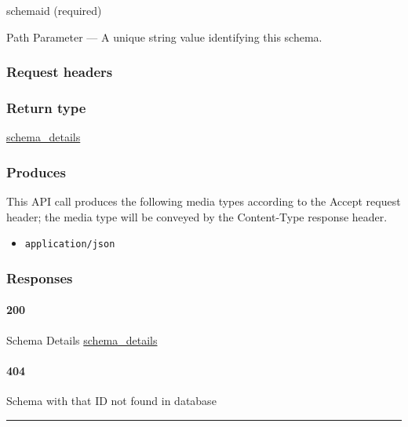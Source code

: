 schemaid (required)

{Path Parameter} --- A unique string value identifying this schema.

\hypertarget{request-headers-76}{%
\subsubsection{Request headers}\label{request-headers-76}}

\hypertarget{return-type-109}{%
\subsubsection{Return type}\label{return-type-109}}

\protect\hyperlink{schema_details}{schema\_details}

\hypertarget{produces-140}{%
\subsubsection{Produces}\label{produces-140}}

This API call produces the following media types according to the
{Accept} request header; the media type will be conveyed by the
{Content-Type} response header.

\begin{itemize}
\tightlist
\item
  \texttt{application/json}
\end{itemize}

\hypertarget{responses-144}{%
\subsubsection{Responses}\label{responses-144}}

\hypertarget{section-464}{%
\paragraph{200}\label{section-464}}

Schema Details \protect\hyperlink{schema_details}{schema\_details}

\hypertarget{section-465}{%
\paragraph{404}\label{section-465}}

Schema with that ID not found in database \protect\hyperlink{}{}

\begin{center}\rule{0.5\linewidth}{\linethickness}\end{center}

